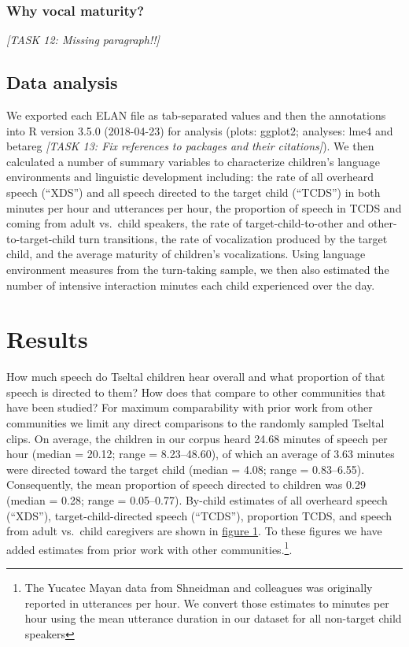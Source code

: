 \documentclass[floatsintext,man]{apa6}
\theoremstyle{definition}
\theoremstyle{definition}
\theoremstyle{definition}
\theoremstyle{remark}
\begin{document}
\subsubsection{Why vocal maturity?}\label{why-vocal-maturity}

\emph{{[}TASK 12: Missing paragraph!!{]}}

\subsection{Data analysis}\label{methods-analysisinfo}

We exported each ELAN file as tab-separated values and then the
annotations into R version 3.5.0 (2018-04-23) for analysis (plots:
ggplot2; analyses: lme4 and betareg \emph{{[}TASK 13: Fix references to
packages and their citations{]}}). We then calculated a number of
summary variables to characterize children's language environments and
linguistic development including: the rate of all overheard speech
(\enquote{XDS}) and all speech directed to the target child
(\enquote{TCDS}) in both minutes per hour and utterances per hour, the
proportion of speech in TCDS and coming from adult vs.~child speakers,
the rate of target-child-to-other and other-to-target-child turn
transitions, the rate of vocalization produced by the target child, and
the average maturity of children's vocalizations. Using language
environment measures from the turn-taking sample, we then also estimated
the number of intensive interaction minutes each child experienced over
the day.

\section{Results}\label{results}

How much speech do Tseltal children hear overall and what proportion of
that speech is directed to them? How does that compare to other
communities that have been studied? For maximum comparability with prior
work from other communities we limit any direct comparisons to the
randomly sampled Tseltal clips. On average, the children in our corpus
heard 24.68 minutes of speech per hour (median = 20.12; range =
8.23--48.60), of which an average of 3.63 minutes were directed toward
the target child (median = 4.08; range = 0.83--6.55). Consequently, the
mean proportion of speech directed to children was 0.29 (median = 0.28;
range = 0.05--0.77). By-child estimates of all overheard speech
(\enquote{XDS}), target-child-directed speech (\enquote{TCDS}),
proportion TCDS, and speech from adult vs.~child caregivers are shown in
\protect\hyperlink{fig1}{figure 1}. To these figures we have added
estimates from prior work with other
communities.\footnote{The Yucatec Mayan data from Shneidman and colleagues was originally reported in utterances per hour. We convert those estimates to minutes per hour using the mean utterance duration in our dataset for all non-target child speakers}.
\end{document}
